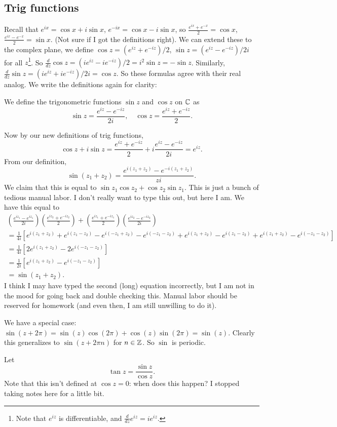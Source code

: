 \subsection{Trig functions}
Recall that $e^{ix}=\cos x + i\sin x $, $e^{-ix}=\cos x -i \sin x$, so $\frac{e^{ix}+e^{-x}}{2}=\cos x$,  $\frac{e^{ix}-e^{-x}}{2}= \sin x$. (Not sure if I got the definitions right). We can extend these to the complex plane, we define $\cos z = (e^{iz}+e^{-iz}) /2$, $\sin z = (e^{iz}-e^{-iz}) / 2i$ for all $z$\footnote{Note that $e^{iz}$ is differentiable, and $\frac{d}{dz}e^{iz}=ie^{iz}$.}. So $\frac{d}{dz}\cos z = (ie^{iz}-ie^{-iz})/2=i^2 \sin z=-\sin z$. Similarly, $\frac{d}{dz}\sin z = (ie^{iz}+ie^{-iz}) / 2i=\cos z$. So these formulas agree with their real analog. We write the definitions again for clarity:
\begin{definition}
    We define the trigonometric functions $\sin z $ and $\cos z$ on $\mathbb{C}$ as \[
    \sin z = \frac{e^{iz}-e^{-iz}}{2i},\quad \cos z = \frac{e^{iz}+e^{-iz}}{2}.
    \] 
\end{definition}
\noindent Now by our new definitions of trig functions,  
\[
    \cos z + i \sin z = \frac{e^{iz}+e^{-iz}}{2}+i \frac{e^{iz}-e^{-iz}}{2i}=e^{iz}.
\] 
From our definition, \[
    \sin (z_1+z_2)= \frac{e^{i(z_1+z_2)}-e^{-i(z_1+z_2)}}{zi}.
\] We claim that this is equal to $\sin z_1 \cos z_2 + \cos z_2 \sin z_1$. This is just a bunch of tedious manual labor. I don't really want to type this out, but here I am. We have this equal to 
\begin{gather*}
\left( \frac{e^{iz_1}-e^{iz_1}}{2i} \right) \left( \frac{e^{iz_2}+e^{-iz_2}}{2} \right) + \left( \frac{e^{iz_1}+e^{-iz_1}}{2} \right) \left( \frac{e^{iz_2}-e^{-iz_2}}{2i} \right) \\
=\frac{1}{4i}\left[ e^{i(z_1+z_2)}+e^{i(z_1-z_2)}-e^{i(-z_1+z_2)}-e^{i(-z_1-z_2)} +e^{i(z_1+z_2)}-e^{i(z_1-z_2)}+e^{i(z_1+z_2)}-e^{i(-z_1-z_2)}\right] \\
=\frac{1}{4i}\left[ 2e^{i(z_1+z_2)}-2e^{i(-z_1-z_2)} \right] \\
=\frac{1}{2i}\left[ e^{i(z_1+z_2)}-e^{i(-z_1-z_2)} \right] \\
=\sin(z_1+z_2).
\end{gather*}
I think I may have typed the second (long) equation incorrectly, but I am not in the mood for going back and double checking this. Manual labor should be reserved for homework (and even then, I am still unwilling to do it).

We have a special case: $\sin(z+2\pi)=\sin(z)\cos(2\pi)+\cos(z)\sin(2\pi)=\sin(z)$. Clearly this generalizes to $\sin(z+2\pi n)$ for $n\in \mathbb{Z}$. So $\sin$ is periodic.
\begin{definition}[Tangent]
    Let \[
    \tan z = \frac{\sin z }{\cos z}.
    \]  Note that this isn't defined at $\cos z =0$: when does this happen? I stopped taking notes here for a little bit.
\end{definition}

